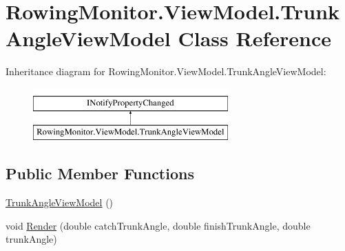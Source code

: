 \hypertarget{class_rowing_monitor_1_1_view_model_1_1_trunk_angle_view_model}{}\section{Rowing\+Monitor.\+View\+Model.\+Trunk\+Angle\+View\+Model Class Reference}
\label{class_rowing_monitor_1_1_view_model_1_1_trunk_angle_view_model}
Inheritance diagram for Rowing\+Monitor.\+View\+Model.\+Trunk\+Angle\+View\+Model\+:\begin{figure}[H]
\begin{center}
\leavevmode
\includegraphics[height=2.000000cm]{class_rowing_monitor_1_1_view_model_1_1_trunk_angle_view_model}
\end{center}
\end{figure}
\subsection*{Public Member Functions}
\begin{DoxyCompactItemize}
\item 
\hyperlink{class_rowing_monitor_1_1_view_model_1_1_trunk_angle_view_model_a66b6cf452c62d64c865b7fdda61edbcb}{Trunk\+Angle\+View\+Model} ()
\item 
void \hyperlink{class_rowing_monitor_1_1_view_model_1_1_trunk_angle_view_model_ad6a2b70f86e46a2c60b90a77fa57e645}{Render} (double catch\+Trunk\+Angle, double finish\+Trunk\+Angle, double trunk\+Angle)
\end{DoxyCompactItemize}
